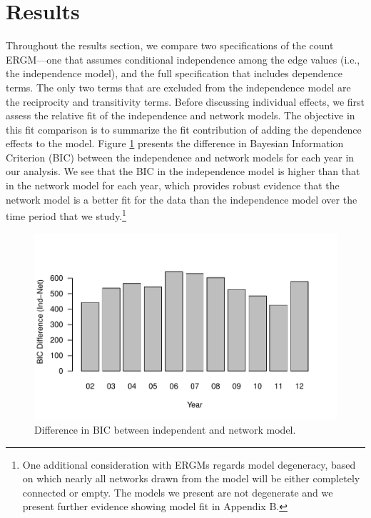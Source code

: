 \documentclass[reqno,onecolumn,letterpaper,12pt]{article}
\begin{document}
\section{Results}

Throughout the results section, we compare two specifications of the count ERGM---one that assumes conditional independence among the edge values (i.e., the independence model), and the full specification that includes dependence terms. The only two terms that are excluded from the independence model are the reciprocity and transitivity terms. Before discussing individual effects, we first assess the relative fit of the independence and network models. The objective in this fit comparison is to summarize the fit contribution of adding the dependence effects to the model. Figure \ref{fig:bic} presents the difference in Bayesian Information Criterion (BIC) between the independence and network models for each year in our analysis. We see that the BIC in the independence model is higher than that in the network model for each year, which provides robust evidence that the network model is a better fit for the data than the independence model over the time period that we study.\footnote{One additional consideration with ERGMs regards model degeneracy, based on which nearly all networks drawn from the model will be either completely connected or empty. The models we present are not degenerate and we present further evidence showing model fit in Appendix B.}


\begin{figure}[!h]
\centering
\includegraphics[scale=.75]{figures/BICdiff.pdf} \vspace{-.5cm}
\caption{\label{fig:bic} Difference in BIC between independent and network model.}
\end{figure}
\end{document}
